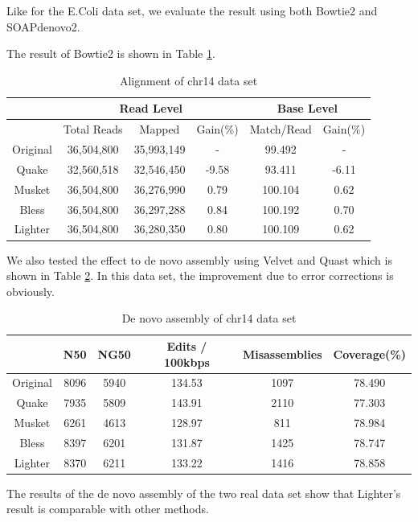 \documentclass[10pt]{article}
\begin{document}
Like for the E.Coli data set, we evaluate the result using both Bowtie2 and SOAPdenovo2.

The result of Bowtie2 is shown in Table \ref{table:chr14_alignment}.

\begin{table}
\begin{tabular}{|c|c|c|c||c|c|}\hline
  & \multicolumn{3}{|c||}{Read Level} & \multicolumn{2}{|c|}{Base Level} \\ \hline
  & Total Reads  & Mapped  &Gain(\%) &	Match/Read	& Gain(\%) \\ \hline
Original &	36,504,800	& 35,993,149	&- 		&	99.492	& - \\ \hline
Quake 	&	32,560,518	& 32,546,450	& -9.58 &	93.411	& -6.11 \\ \hline
Musket 	&	36,504,800 	&	36,276,990	& 0.79	& 100.104	& 0.62 \\ \hline
Bless 	&	36,504,800	&36,297,288	& 0.84	& 100.192	&	0.70 \\ \hline
Lighter	&   36,504,800	&36,280,350	& 0.80	& 100.109	& 0.62 \\ \hline
\end{tabular}
\caption{Alignment of chr14 data set\label{table:chr14_alignment}}
\end{table}

We also tested the effect to de novo assembly using Velvet and Quast which is shown in Table \ref{table:chr14_assembly}. In this data set, the improvement due to error corrections is obviously. 

\begin{table}
\begin{tabular}{|c|c|c|c|c|c|} \hline
	   & N50 &	NG50	& Edits / 100kbps &	Misassemblies	& Coverage(\%) \\ \hline
Original &	8096 &5940	&134.53	&1097	&78.490 \\ \hline
Quake	& 7935	&5809	&143.91	&2110	&77.303 \\ \hline
Musket	& 6261	&4613	&128.97	&811	&78.984 \\ \hline
Bless	& 8397	&6201	&131.87 &1425	&78.747 \\ \hline
Lighter	& 8370	&6211	&133.22	&1416	&78.858 \\ \hline
\end{tabular}
\caption{De novo assembly of chr14 data set\label{table:chr14_assembly}}
\end{table}

The results of the de novo assembly of the two real data set show that Lighter's result is comparable with other methods.
\end{document}
